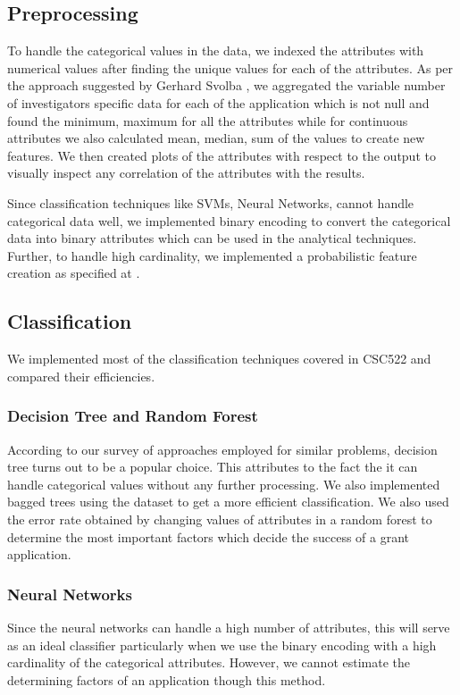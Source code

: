 \documentclass{article} %
\begin{document}
	\subsection{Preprocessing}
	
	To handle the categorical values in the data, we indexed the attributes with numerical values after finding the unique values for each of the attributes. As per the approach suggested by Gerhard Svolba \cite{OneRow}, we aggregated the variable number of investigators specific data for each of the application which is not null and found the minimum, maximum for all the attributes while for continuous attributes we also calculated mean, median, sum of the values to create new features. We then created plots of the attributes with respect to the output to visually inspect any correlation of the attributes with the results.
	
	Since classification techniques like SVMs, Neural Networks, cannot handle categorical data well, we implemented binary encoding to convert the categorical data into binary attributes which can be used in the analytical techniques. Further, to handle high cardinality, we implemented a probabilistic feature creation as specified at \cite{HighCard}. 
	
	\subsection{Classification}
	
	We implemented most of the classification techniques covered in CSC522 and compared their efficiencies.
	
	\subsubsection{Decision Tree and Random Forest}
	According to our survey of approaches employed for similar problems, decision tree turns out to be a popular choice. This attributes to the fact the it can handle categorical values without any further processing. We also implemented bagged trees using the dataset to get a more efficient classification. We also used the error rate obtained by changing values of attributes in a random forest to determine the most important factors which decide the success of a grant application.
	
	\subsubsection{Neural Networks}
	Since the neural networks can handle a high number of attributes, this will serve as an ideal classifier particularly when we use the binary encoding with a high cardinality of the categorical attributes. However, we cannot estimate the determining factors of an application though this method.
	
\end{document}
